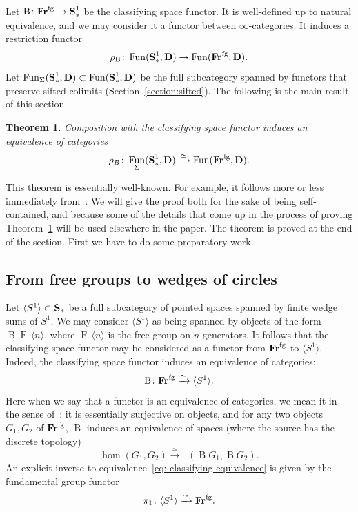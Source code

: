\documentclass[psamsfonts]{amsart}
\theoremstyle{plain}
\newtheorem{thm}{Theorem}[section]
\theoremstyle{definition}
\theoremstyle{remark}
\newcommand{\catname}[1]{{\normalfont\textbf{#1}}}
\newcommand{\circles}{\langle S^1 \rangle}
\newcommand{\spaces}{\catname{S}_*}
\newcommand{\connected}{\spaces^{1}}
\newcommand{\fr}{\allfr^{\mathrm{fg}}}
\newcommand{\allfr}{\catname{Fr}}
\newcommand{\classifying}{\operatorname{B}}
\newcommand{\free}[1]{\operatorname{F}\,\langle #1\rangle}
\DeclareMathOperator{\map}{Map}
\DeclareMathOperator{\pointedmaps}{\map_*}
\DeclareMathOperator{\fun}{Fun}
\begin{document}
Let $\classifying\colon \fr \to \connected$ be the classifying space functor. It is well-defined up to natural equivalence, and we may consider it a functor between $\infty$-categories. It induces a restriction functor
\[
\rho_{\classifying}\colon \fun(\connected, \catname{D}) \to \fun(\fr, \catname{D}).
\]
Let $\fun_{\Sigma}(\connected, \catname{D})\subset \fun(\connected, \catname{D})$ be the full subcategory spanned by functors that preserve sifted colimits (Section~\ref{section:sifted}). The following is the main result of this section
\begin{thm}\label{theorem: fr to connected}
Composition with the classifying space functor induces an equivalence of categories
\[
\rho_B\colon \fun_{\Sigma}(\connected, \catname{D}) \xrightarrow{\simeq} \fun(\fr, \catname{D}).
\]
\end{thm}
This theorem is essentially well-known. For example, it follows more or less immediately from~\cite[Corollary 5.2.6.21]{LurieHA}. We will give the proof both for the sake of being self-contained, and because some of the details that come up in the process of proving Theorem~\ref{theorem: fr to connected} will be used elsewhere in the paper. The theorem is proved at the end of the section. First we have to do some preparatory work.
\subsection{From free groups to wedges of circles} Let $\circles\subset \spaces$ be a full subcategory of pointed spaces spanned by finite wedge sums of $S^1$. We may consider $\circles$ as being spanned by objects of the form $\classifying \free{n}$, where $\free{n}$ is the free group on $n$ generators. It follows that the classifying space functor may be considered as a functor from $\fr$ to $\circles$. Indeed, the classifying space functor induces an equivalence of categories:
\begin{equation}\label{eq: classifying equivalence}
\classifying\colon  \fr \xrightarrow{\simeq} \circles.
\end{equation}
Here when we say that a functor is an equivalence of categories, we mean it in the sense of~\cite[Definition 1.1.3.6]{LurieHTT}: it is essentially surjective on objects, and for any two objects $G_1, G_2$ of $\fr$, $\classifying$ induces an equivalence of spaces (where the source has the discrete topology)
\[
 \hom(G_1, G_2) \xrightarrow{\simeq}\pointedmaps(\classifying G_1, \classifying G_2).
\]
An explicit inverse to equivalence~\eqref{eq: classifying equivalence} is given by the fundamental group functor
\[\label{eq: pi_1 equivalence}
\pi_1\colon \circles \xrightarrow{\simeq} \fr.
\]
\end{document}
